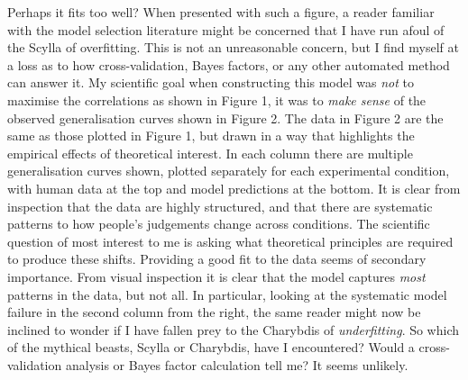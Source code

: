 \documentclass[doc]{apa6}
\theoremstyle{definition}
\theoremstyle{definition}
\theoremstyle{definition}
\theoremstyle{remark}
\begin{document}
Perhaps it fits too well? When presented with such a figure, a reader
familiar with the model selection literature might be concerned that I
have run afoul of the Scylla of overfitting. This is not an unreasonable
concern, but I find myself at a loss as to how cross-validation, Bayes
factors, or any other automated method can answer it. My scientific goal
when constructing this model was \emph{not} to maximise the correlations
as shown in Figure 1, it was to \emph{make sense} of the observed
generalisation curves shown in Figure 2. The data in Figure 2 are the
same as those plotted in Figure 1, but drawn in a way that highlights
the empirical effects of theoretical interest. In each column there are
multiple generalisation curves shown, plotted separately for each
experimental condition, with human data at the top and model predictions
at the bottom. It is clear from inspection that the data are highly
structured, and that there are systematic patterns to how people's
judgements change across conditions. The scientific question of most
interest to me is asking what theoretical principles are required to
produce these shifts. Providing a good fit to the data seems of
secondary importance. From visual inspection it is clear that the model
captures \emph{most} patterns in the data, but not all. In particular,
looking at the systematic model failure in the second column from the
right, the same reader might now be inclined to wonder if I have fallen
prey to the Charybdis of \emph{underfitting}. So which of the mythical
beasts, Scylla or Charybdis, have I encountered? Would a
cross-validation analysis or Bayes factor calculation tell me? It seems
unlikely.
\end{document}
